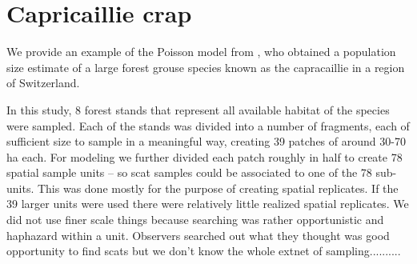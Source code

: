 {



\section{Capricaillie crap}

We provide an example of the Poisson model from 
 \citet{mollet_etal:2012}, who obtained a population
size estimate  of a large forest grouse species known as the
capracaillie in a region of Switzerland. 

In this study, 
8 forest stands  that represent all available habitat of the
species were sampled. Each of the stands was divided into a number of
fragments, each of 
sufficient size to sample in a meaningful way, creating 39 patches of around
30-70 ha each. For modeling we further divided each patch roughly in half to
create 78 spatial sample units -- so scat samples could be associated to one of
the 78 sub-units. This was done mostly for the purpose of creating spatial
replicates. If the 39 larger units were used there were relatively little
realized spatial replicates. 
We did not use finer scale things because searching was rather opportunistic
and haphazard within a unit. Observers searched out what they thought was
good opportunity to find scats but we don't know the whole extnet of
sampling..........

}
